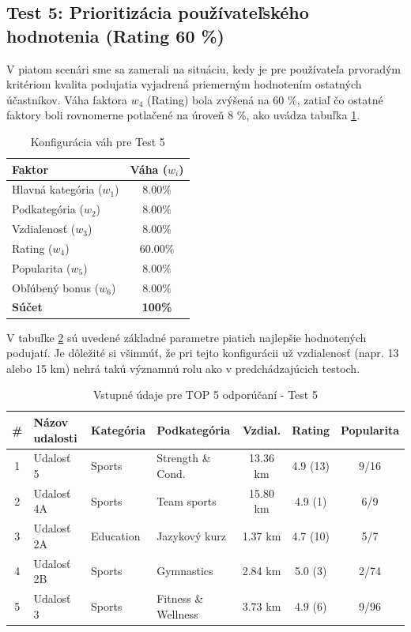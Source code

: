\documentclass[12pt,a4paper]{article}
\begin{document}
\subsection{Test 5: Prioritizácia používateľského hodnotenia (Rating 60 \%)}

V piatom scenári sme sa zamerali na situáciu, kedy je pre používateľa prvoradým kritériom kvalita podujatia vyjadrená priemerným hodnotením ostatných účastníkov. Váha faktora $w_4$ (Rating) bola zvýšená na 60 \%, zatiaľ čo ostatné faktory boli rovnomerne potlačené na úroveň 8 \%, ako uvádza tabuľka \ref{tab:vahy_test5}.

\begin{table}[H]
\centering
\begin{tabular}{|l|c|}
\hline
\textbf{Faktor} & \textbf{Váha ($w_i$)} \\
\hline
Hlavná kategória ($w_1$) & 8.00\% \\
Podkategória ($w_2$) & 8.00\% \\
Vzdialenosť ($w_3$) & 8.00\% \\
Rating ($w_4$) & 60.00\% \\
Popularita ($w_5$) & 8.00\% \\
Obľúbený bonus ($w_6$) & 8.00\% \\
\hline
\textbf{Súčet} & \textbf{100\%} \\
\hline
\end{tabular}
\caption{Konfigurácia váh pre Test 5}
\label{tab:vahy_test5}
\end{table}

V tabuľke \ref{tab:data_test5} sú uvedené základné parametre piatich najlepšie hodnotených podujatí. Je dôležité si všimnúť, že pri tejto konfigurácii už vzdialenosť (napr. 13 alebo 15 km) nehrá takú významnú rolu ako v predchádzajúcich testoch.

\begin{table}[H]
\centering
\small
\begin{tabular}{|c|l|l|l|c|c|c|}
\hline
\textbf{\#} & \textbf{Názov udalosti} & \textbf{Kategória} & \textbf{Podkategória} & \textbf{Vzdial.} & \textbf{Rating} & \textbf{Popularita} \\
\hline
1 & Udalosť 5  & Sports    & Strength \& Cond.   & 13.36 km & 4.9 (13) & 9/16 \\
2 & Udalosť 4A & Sports    & Team sports         & 15.80 km & 4.9 (1)  & 6/9 \\
3 & Udalosť 2A & Education & Jazykový kurz       & 1.37 km  & 4.7 (10) & 5/7 \\
4 & Udalosť 2B & Sports    & Gymnastics          & 2.84 km  & 5.0 (3)  & 2/74 \\
5 & Udalosť 3  & Sports    & Fitness \& Wellness & 3.73 km  & 4.9 (6)  & 9/96 \\
\hline
\end{tabular}
\caption{Vstupné údaje pre TOP 5 odporúčaní - Test 5}
\label{tab:data_test5}
\end{table}
\end{document}
